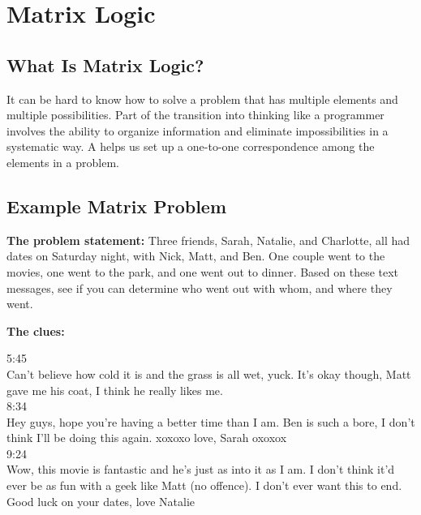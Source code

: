 
\newcommand{\mO}{\textbf{\textcolor{mLightGreen}{O}}}
\newcommand{\mX}{\textbf{\textcolor{mLightBrown}{X}}}

\setcounter{chapter}{2}
\chapter{Matrix Logic}


\minitoc

\section{What Is Matrix Logic?}

It can be hard to know how to solve a problem that has multiple elements and multiple possibilities.  Part of the transition into thinking like a programmer involves the ability to organize information and eliminate impossibilities in a systematic way.  A  helps us set up a one-to-one correspondence among the elements in a problem.

\section{Example Matrix Problem}

\textbf{The problem statement:} Three friends, Sarah, Natalie, and Charlotte, all had dates on Saturday night, with Nick, Matt, and Ben.  One couple went to the movies, one went to the park, and one went out to dinner.  Based on these text messages, see if you can determine who went out with whom, and where they went.

\begin{minipage}{\textwidth}
\textbf{The clues:}\\

\begin{tcolorbox}[width=\textwidth,colback=black!10]
5:45\\
Can't believe how cold it is and the grass is all wet, yuck. It's okay though, Matt gave me his coat, I think he really likes me.\\

8:34\\
Hey guys, hope you're having a better time than I am. Ben is such a bore, I don't think I'll be doing this again. xoxoxo love, Sarah oxoxox\\

9:24\\
Wow, this movie is fantastic and he's just as into it as I am. I don't think it'd ever be as fun with a geek like Matt (no offence). I don't ever want this to end. Good luck on your dates, love Natalie
\end{tcolorbox}
\end{minipage}

